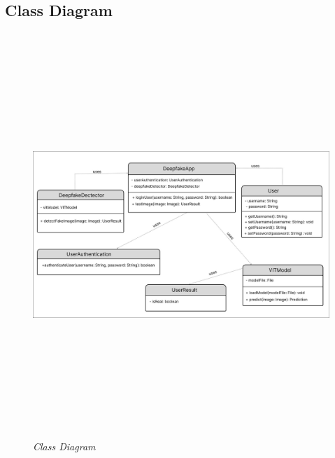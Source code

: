 
\subsection{Class Diagram}
\vspace{1cm}
\begin{figure}[h]
    \includegraphics[width=1\textwidth,height=6in,keepaspectratio]{img/classdiagram.jpg}
    \caption{\textit{Class Diagram}}
\end{figure}

\justify


